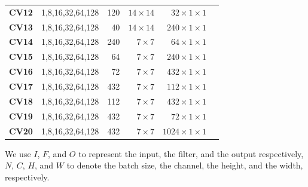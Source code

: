 \begin{table}[]
\begin{threeparttable}
\begin{tabular}{lrrrrr}
\textbf{CV12} & 1,8,16,32,64,128  & 120   & $14\times 14$   & $32 \times 1\times 1$\\
\textbf{CV13} & 1,8,16,32,64,128  & 40    & $14\times 14$   & $240 \times 1\times 1$\\
\textbf{CV14} & 1,8,16,32,64,128  & 240   & $7\times 7$     & $64  \times 1\times 1$\\
\textbf{CV15} & 1,8,16,32,64,128  & 64    & $7\times 7$     & $240 \times 1\times 1$\\
\textbf{CV16} & 1,8,16,32,64,128  & 72    & $7\times 7$     & $432 \times 1\times 1$\\
\textbf{CV17} & 1,8,16,32,64,128  & 432   & $7\times 7$     & $112 \times 1\times 1$\\
\textbf{CV18} & 1,8,16,32,64,128  & 112   & $7\times 7$     & $432 \times 1\times 1$\\
\textbf{CV19} & 1,8,16,32,64,128  & 432   & $7\times 7$     & $72 \times 1\times 1$\\
\textbf{CV20} & 1,8,16,32,64,128  & 432   & $7\times 7$     & $1024 \times 1\times 1$\\

\bottomrule
\end{tabular}
\begin{tablenotes}
\item[\dag] We use $I$, $F$, and $O$ to represent the input, the filter, and the output respectively, $N$, $C$, $H$, and $W$
to denote the batch size, the channel, the height, and the width, respectively.
\end{tablenotes}
\end{threeparttable}
\end{table}

